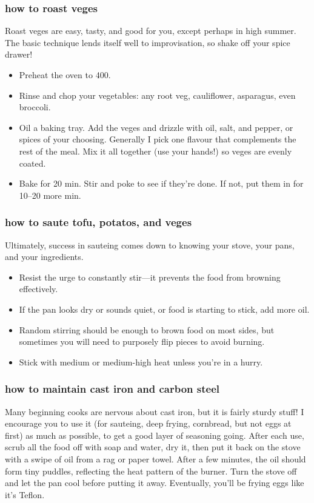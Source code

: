 \subsubsection{how to roast veges}
Roast veges are easy, tasty, and good for you, except perhaps in high summer. The basic technique lends itself well to improvisation, so shake off your spice drawer!
  \begin{itemize}
  \item Preheat the oven to 400\0.
  \item Rinse and chop your vegetables: any root veg, cauliflower, asparagus, even broccoli.
  \item Oil a baking tray. Add the veges and drizzle with oil, salt, and pepper, or spices of your choosing. Generally I pick one flavour that complements the rest of the meal. Mix it all together (use your hands!) so veges are evenly coated.
  \item Bake for 20 min. Stir and poke to see if they're done. If not, put them in for 10--20 more min.
  \end{itemize}

\subsubsection{how to saute tofu, potatos, and veges}
Ultimately, success in sauteing comes down to knowing your stove, your pans, and your ingredients.
  \begin{itemize}
    \item Resist the urge to constantly stir---it prevents the food from browning effectively.
  \item If the pan looks dry or sounds quiet, or food is starting to stick, add more oil.
  \item Random stirring should be enough to brown food on most sides, but sometimes you will need to purposely flip pieces to avoid burning.
  \item Stick with medium or medium-high heat unless you're in a hurry.
  \end{itemize}

\subsubsection{how to maintain cast iron and carbon steel}
Many beginning cooks are nervous about cast iron, but it is fairly sturdy stuff! I encourage you to use it (for sauteing, deep frying, cornbread, but not eggs at first) as much as possible, to get a good layer of seasoning going. After each use, scrub all the food off with soap and water, dry it, then put it back on the stove with a swipe of oil from a rag or paper towel. After a few minutes, the oil should form tiny puddles, reflecting the heat pattern of the burner. Turn the stove off and let the pan cool before putting it away. Eventually, you'll be frying eggs like it's Teflon.

